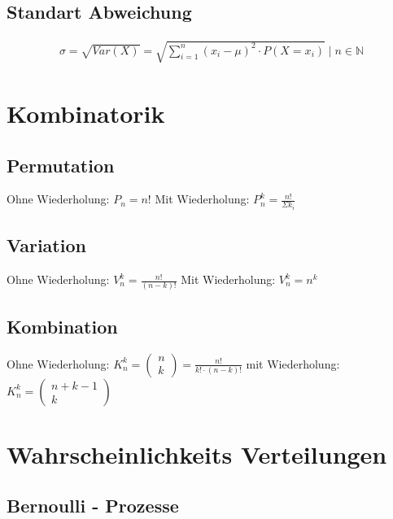 \documentclass[12pt]{article}
\begin{document}
\subsection*{Standart Abweichung }

\begin{align*}
	\sigma = \sqrt{Var(X)} = \sqrt{\sum_{i=1}^{n} (x_i - \mu)^2 \cdot  P(X=x_i)} \mid n \in \mathbb{N} 
\end{align*}



\section{ Kombinatorik }
\subsection*{ Permutation }

Ohne Wiederholung: \( P_n = n! \) \newline
Mit Wiederholung: \( P_n ^{k} = \frac{n!}{\Sigma k_i} \)

\subsection*{Variation}

Ohne Wiederholung: \( V_n^k = \frac{n!}{(n-k)!} \) \newline
Mit Wiederholung: \( V_n^k = n^k \) \newline

\subsection*{Kombination}

Ohne Wiederholung: \( K_n^k = \begin{pmatrix}
n \\ k 
\end{pmatrix} = \frac{n!}{k! \cdot (n-k)!} \) \newline
mit Wiederholung: \( K_n^k = \begin{pmatrix}
n + k - 1\\ k 
\end{pmatrix} \)

\section{Wahrscheinlichkeits Verteilungen}

\subsection*{ Bernoulli - Prozesse }
\end{document}
